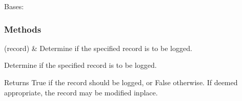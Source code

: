 \documentclass[letterpaper,10pt,english]{sphinxmanual}
\begin{document}
\begin{fulllineitems}
\label{\detokenize{CoolDwarf.utils.misc:CoolDwarf.utils.misc.logging.CustomFilter}}
\pysigstartsignatures
{}
\pysigstopsignatures
\sphinxAtStartPar
Bases: 
\subsubsection*{Methods}


\begin{savenotes}\sphinxattablestart
\sphinxthistablewithglobalstyle
\sphinxthistablewithnovlinesstyle
\centering
\begin{tabulary}{\linewidth}[t]{}
\sphinxtoprule
\sphinxtableatstartofbodyhook
\sphinxAtStartPar
{\hyperref[\detokenize{CoolDwarf.utils.misc:CoolDwarf.utils.misc.logging.CustomFilter.filter}]{}}(record)
&
\sphinxAtStartPar
Determine if the specified record is to be logged.
\\
\sphinxbottomrule
\end{tabulary}
\sphinxtableafterendhook\par
\sphinxattableend\end{savenotes}

\begin{fulllineitems}
\label{\detokenize{CoolDwarf.utils.misc:CoolDwarf.utils.misc.logging.CustomFilter.filter}}
\pysigstartsignatures
{}
\pysigstopsignatures
\sphinxAtStartPar
Determine if the specified record is to be logged.

\sphinxAtStartPar
Returns True if the record should be logged, or False otherwise.
If deemed appropriate, the record may be modified in\sphinxhyphen{}place.

\end{fulllineitems}


\end{fulllineitems}

\end{document}
